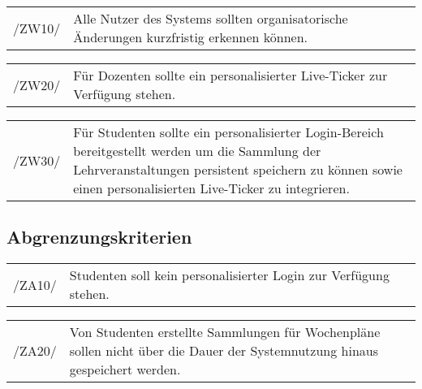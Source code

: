 \begin{tabular}{p{1.5cm}p{14.5cm}}	
	 /ZW10/& Alle Nutzer des Systems sollten organisatorische Änderungen kurzfristig erkennen können. \\[0.25cm]
\end{tabular}

\begin{tabular}{p{1.5cm}p{14.5cm}}	
	 /ZW20/& Für Dozenten sollte ein personalisierter Live-Ticker zur Verfügung stehen. \\[0.25cm]
\end{tabular}

\begin{tabular}{p{1.5cm}p{14.5cm}}	
	 /ZW30/& Für Studenten sollte ein personalisierter Login-Bereich bereitgestellt werden um die Sammlung der Lehrveranstaltungen persistent speichern zu können sowie einen personalisierten Live-Ticker zu integrieren. \\[0.25cm]
\end{tabular}

\subsection{Abgrenzungskriterien}

\begin{tabular}{p{1.5cm}p{14.5cm}}	
	 /ZA10/& Studenten soll kein personalisierter Login zur Verfügung stehen.  \\[0.25cm]
\end{tabular}

\begin{tabular}{p{1.5cm}p{14.5cm}}	
	 /ZA20/& Von Studenten erstellte Sammlungen für Wochenpläne sollen nicht über die Dauer der Systemnutzung hinaus gespeichert werden. \\[0.25cm]
\end{tabular}